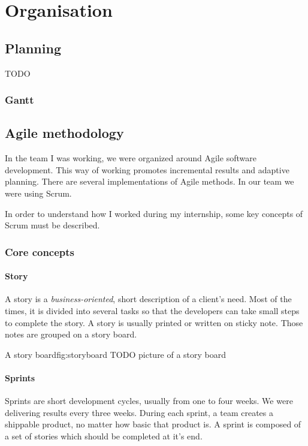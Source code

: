 \chapter{Organisation}

\section{Planning}
TODO

\subsection{Gantt}
%

\section{Agile methodology}

In the team I was working, we were organized around Agile software
development. This way of working promotes incremental results and adaptive planning.
There are several implementations of Agile methods. In our team we were using Scrum.

In order to understand how I worked during my internship, some key concepts of Scrum must be described.

\subsection{Core concepts}

\subsubsection{Story}\label{sec:story}
A story is a \emph{business-oriented}, short description of a client's
need. Most of the times, it is divided into several tasks so that the developers
can take small steps to complete the story. A story is usually printed or
written on sticky note. Those notes are grouped on a story board.

\begin{figureGraphics}{A story board}{fig:storyboard}
    TODO picture of a story board
\end{figureGraphics}


\subsubsection{Sprints}\label{sec:sprint}
Sprints are short development cycles, usually from one to four weeks. We were
delivering results every three weeks. During each sprint, a team creates a
shippable product, no matter how basic that product is. A sprint is composed of
a set of stories which should be completed at it's end.

